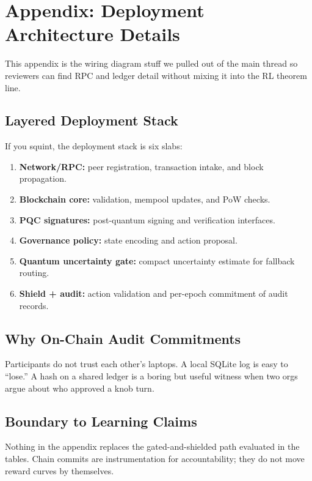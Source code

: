 \section{Appendix: Deployment Architecture Details}

This appendix is the wiring diagram stuff we pulled out of the main thread so reviewers can find RPC and ledger detail without mixing it into the RL theorem line.

\subsection{Layered Deployment Stack}

If you squint, the deployment stack is six slabs:
\begin{enumerate}
    \item \textbf{Network/RPC:} peer registration, transaction intake, and block propagation.
    \item \textbf{Blockchain core:} validation, mempool updates, and PoW checks.
    \item \textbf{PQC signatures:} post-quantum signing and verification interfaces.
    \item \textbf{Governance policy:} state encoding and action proposal.
    \item \textbf{Quantum uncertainty gate:} compact uncertainty estimate for fallback routing.
    \item \textbf{Shield + audit:} action validation and per-epoch commitment of audit records.
\end{enumerate}

\subsection{Why On-Chain Audit Commitments}

Participants do not trust each other's laptops. A local SQLite log is easy to ``lose.'' A hash on a shared ledger is a boring but useful witness when two orgs argue about who approved a knob turn.

\subsection{Boundary to Learning Claims}

Nothing in the appendix replaces the gated-and-shielded path evaluated in the tables. Chain commits are instrumentation for accountability; they do not move reward curves by themselves.
